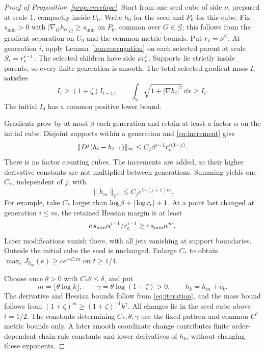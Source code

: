 \begin{proof}[Proof of Proposition~\ref{prop:envelope}]
Start from one seed cube of side \(\nu\), prepared at scale \(1\),
compactly inside \(U_0\). Write \(h_0\) for the seed and \(P_0\)
for this cube. Fix \(s_{\min}>0\) with
\( |\nabla_Gh_0|_G\ge s_{\min}\) on \(P_0\), common over
\(G\in\mathcal G\); this follows from the gradient separation on
\(U_0\) and the common metric bounds. Put \(r_{\rm c}=\nu^2\).
At generation \(i\), apply Lemma~\ref{lem:corrugation} on each
selected parent at scale \(S_i=r_{\rm c}^{i-1}\).
The selected children have side \(\nu r_{\rm c}^{i}\).
Supports lie strictly inside parents, so every finite generation
is smooth. The total selected gradient mass \(I_i\) satisfies
\[
 I_i\ge(1+\zeta)I_{i-1},\qquad
 \int_V\sqrt{1+|\nabla h_i|^2}\,\dd x\ge I_i.
\]
The initial \(I_0\) has a common positive lower bound.

Gradients grow by at most \(\beta\) each generation and retain
at least a factor \(\alpha\) on the initial cube. Disjoint supports
within a generation and \eqref{eq:increment} give
\[
 \|D^j(h_i-h_{i-1})\|_\infty
 \le C_j\beta^{i-1}r_{\rm c}^{i(1-j)}.
\]
There is no factor counting cubes. The increments are added, so
their higher derivative constants are not multiplied between
generations. Summing yields one \(C_*\), independent of \(j\), with
\begin{equation}\label{eq:iteration}
 \|h_m\|_{C^j}\le C_j e^{C_*(j+1)m}.
\end{equation}
For example, take \(C_*\) larger than
\(\log\beta+|\log r_{\rm c}|+1\).
At a point last changed at generation \(i\le m\), the retained
Hessian margin is at least
\[
 c\,s_{\min}\alpha^{i-1}/r_{\rm c}^{i-1}
 \ge c\,s_{\min}\alpha^m.
\]
Later modifications vanish there, with all jets vanishing at
support boundaries. Outside the initial cube the seed is unchanged.
Enlarge \(C_*\) to obtain \(\max_eJ_{h_m}(e)\ge c e^{-C_*m}\)
on \(t\ge1/4\).

Choose once \(\theta>0\) with \(C_*\theta\le\delta\), and put
\[
 m=\lfloor\theta\log k\rfloor,\qquad
 \gamma=\theta\log(1+\zeta)>0,\qquad h_k=h_m+c_k.
\]
The derivative and Hessian bounds follow from \eqref{eq:iteration},
and the mass bound follows from
\((1+\zeta)^m\ge(1+\zeta)^{-1}k^\gamma\).
All changes lie in the seed cube above \(t=1/2\).
The constants determining \(C_*,\theta,\gamma\) use the fixed
pattern and common \(C^1\) metric bounds only. A later smooth coordinate
change contributes finite order-dependent chain-rule constants and
lower derivatives of \(h_k\), without changing these exponents.
\end{proof}
